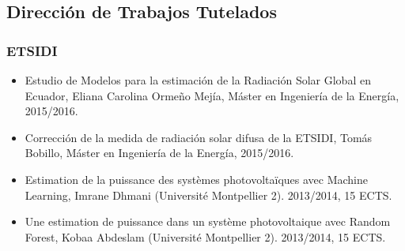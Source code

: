 \documentclass[article, a4paper]{memoir}
\begin{document}
\subsection{Dirección de Trabajos Tutelados}
\label{sec:org61ef649}
\subsubsection{ETSIDI}
\label{sec:org0abf9c4}
\begin{itemize}
\item \guillemotleft{}Estudio de Modelos para la estimación de la Radiación Solar Global en Ecuador\guillemotright{}, Eliana Carolina Ormeño Mejía, Máster en Ingeniería de la Energía, 2015/2016.
\item \guillemotleft{}Corrección de la medida de radiación solar difusa de la ETSIDI\guillemotright{}, Tomás Bobillo, Máster en Ingeniería de la Energía, 2015/2016.
\item \guillemotleft{}Estimation de la puissance des systèmes photovoltaïques avec Machine Learning\guillemotright{}, Imrane Dhmani (Université Montpellier 2). 2013/2014, 15 ECTS.
\item \guillemotleft{}Une estimation de puissance dans un système photovoltaique avec Random Forest\guillemotright{}, Kobaa Abdeslam (Université Montpellier 2). 2013/2014, 15 ECTS.
\end{itemize}
\end{document}
